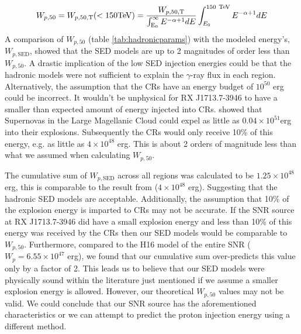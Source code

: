 \documentclass[12pt,a4paper]{article}
\begin{document}
\begin{equation}\label{eq:normescape}
W_{p,50} = W_{p,50,\mathrm{T}}\mathrm{(<150TeV)} = \dfrac{W_{p,50,\mathrm{T}}}{\int_{\mathrm{E_0}}^{\infty}  E^{-\alpha + 1} dE}\int_{E_0}^{150 \ \mathrm{TeV}}  E^{-\alpha + 1} dE\\
\end{equation}
A comparison of $W_{p,50}$ (table \ref{tab:hadronicparams}) with the modeled energy's, $W_{p,\mathrm{SED}}$, showed that the SED models are up to 2 magnitudes of order less than $W_{p,50}$. A drastic implication of the low SED injection energies could be that the hadronic models were not sufficient to explain the $\gamma$-ray flux in each region. Alternatively, the assumption that the CRs have an energy budget of $10^{50}$ erg could be incorrect. It wouldn't be unphysical for RX J1713.7-3946 to have a smaller than expected amount of energy injected into CRs. \cite{2017ApJ...837...36L} showed that Supernovas in the Large Magellanic Cloud could expel as little as $0.04 \times 10^{51}$erg into their explosions. Subsequently the CRs would only receive 10\% of this energy, e.g. as little as $4 \times 10^{48}$ erg. This is about 2 orders of magnitude less than what we assumed when calculating $W_{p,50}$. 

The cumulative sum of $W_{p,\mathrm{SED}}$ across all regions was calculated to be $1.25 \times 10^{48}$ erg, this is comparable to the result from \cite{2017ApJ...837...36L} ($4 \times 10^{48}$ erg). Suggesting that the hadronic SED models are acceptable. Additionally, the assumption that 10\% of the explosion energy is imparted to CRs may not be accurate. If the SNR source at RX J1713.7-3946 did have a small explosion energy and less than 10\% of this energy was received by the CRs then our SED models would be comparable to $W_{p,50}$. Furthermore, compared to the H16 model of the entire SNR ($W_p = 6.55 \times 10^{47}$ erg), we found that our cumulative sum over-predicts this value only by a factor of 2. This leads us to believe that our SED models were physically sound within the literature just mentioned if we assume a smaller explosion energy is allowed. However, our theoretical $W_{p,50}$ values may not be valid. We could conclude that our SNR source has the aforementioned characteristics or we can attempt to predict the proton injection energy using a different method.
\end{document}
